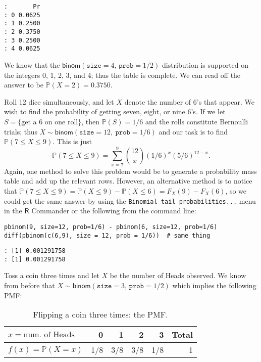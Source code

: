 \begin{verbatim}
:       Pr
: 0 0.0625
: 1 0.2500
: 2 0.3750
: 3 0.2500
: 4 0.0625
\end{verbatim}


We know that the
\(\mathsf{binom}(\mathtt{size}=4,\,\mathtt{prob}=1/2)\) distribution
is supported on the integers 0, 1, 2, 3, and 4; thus the table is
complete. We can read off the answer to be \(\mathbb{P}(X=2)=0.3750\).


Roll 12 dice simultaneously, and let \(X\) denote the number of 6's
that appear. We wish to find the probability of getting seven, eight,
or nine 6's. If we let \(S=\{ \mbox{get a 6 on one roll} \} \), then
\(\mathbb{P}(S)=1/6\) and the rolls constitute Bernoulli trials; thus
\(X\sim\mathsf{binom}(\mathtt{size}=12,\ \mathtt{prob}=1/6)\) and our
task is to find \(\mathbb{P}(7\leq X\leq9)\). This is just
\[ 
\mathbb{P}(7\leq X\leq9)=\sum_{x=7}^{9}{12 \choose x}(1/6)^{x}(5/6)^{12-x}.
\]
Again, one method to solve this problem would be to generate a
probability mass table and add up the relevant rows. However, an
alternative method is to notice that \(\mathbb{P}(7\leq
X\leq9)=\mathbb{P}(X\leq9)-\mathbb{P}(X\leq6)=F_{X}(9)-F_{X}(6)\), so
we could get the same answer by using the \texttt{Binomial tail
probabilities...} menu in the \(\mathsf{R}\) Commander or the
following from the command line:

\begin{verbatim}
pbinom(9, size=12, prob=1/6) - pbinom(6, size=12, prob=1/6)
diff(pbinom(c(6,9), size = 12, prob = 1/6))  # same thing
\end{verbatim}

\begin{verbatim}
: [1] 0.001291758
: [1] 0.001291758
\end{verbatim}



\label{exa-toss-coin-3-withR} Toss a coin three times and let \(X\) be the
number of Heads observed. We know from before that
\(X\sim\mathsf{binom}(\mathtt{size}=3,\,\mathtt{prob}=1/2)\) which
implies the following PMF:

\begin{table}[htb]
\caption[Flipping a coin thrice: PMF]{\label{tab-flip-coin-thrice}Flipping a coin three times: the PMF.}
\centering
\begin{tabular}{lrrrrr}
\(x=\mbox{num. of Heads}\) & 0 & 1 & 2 & 3 & Total\\
\hline
\(f(x) = \mathbb{P}(X = x)\) & 1/8 & 3/8 & 3/8 & 1/8 & 1\\
\end{tabular}
\end{table}

